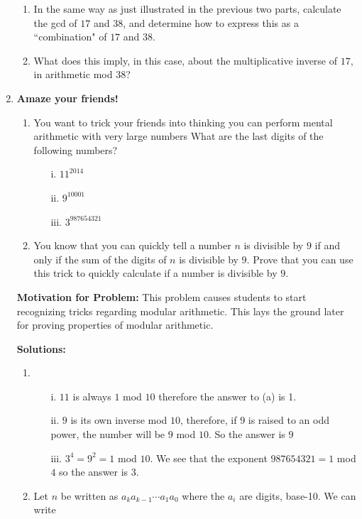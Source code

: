 \documentclass[11pt]{article}
\newif\ifsolutions
\begin{document}
\begin{enumerate}
\begin{enumerate}
\item In the same way as just illustrated in the previous two parts, calculate the gcd of $17$ and $38$, and determine how to express this as a ``combination" of $17$ and $38$. \ifsolutions{$\gcd(17, 38) = 1 = 13 \times 38 - 29 \times 17; also, more simply, -4 \times 38 + 9 \times 17, but the algorithm produces the former$} \fi

\item What does this imply, in this case, about the multiplicative inverse of $17$, in arithmetic mod $38$? \ifsolutions{It is equal to -29, which is equal to 9}

{\bf Motivation for problem:} This is supposed to provide the students with some understanding of how the extended-gcd works. \fi
\end{enumerate}

\item {\bf Amaze your friends!} 
\begin{enumerate}
\item You want to trick your friends into thinking you can perform mental arithmetic with very large numbers
What are the last digits of the following numbers?
\begin{enumerate}
\item[i.] \quad $11^{2014}$
\item[ii.] \quad $9^{10001}$
\item[iii.] \quad $3^{987654321}$
\end{enumerate}
\item You know that you can quickly tell a number $n$ is divisible by $9$ if and only if the sum of the digits of $n$ is divisible by $9$. Prove that you can use this trick to quickly calculate if a number is divisible by $9$.
\end{enumerate}

\ifsolutions
\textbf{Motivation for Problem:} This problem causes students to start recognizing tricks regarding modular arithmetic. This lays the ground later for proving properties of modular arithmetic.

\textbf{Solutions:}
\begin{enumerate}
\item
\begin{enumerate}
\item[i.] \quad $11$ is always $1$ mod $10$ therefore the answer to (a) is 1.
\item[ii.] \quad $9$ is its own inverse mod $10$, therefore, if $9$ is raised to an odd power, the number will be $9$ mod $10$. So the answer is $9$
\item[iii.] \quad $3^4 = 9^2 = 1 $ mod $ 10$. We see that the exponent $987654321 = 1$ mod $4$ so the answer is $3$.
\end{enumerate}
\item  Let $n$ be written as $a_k a_{k-1}\cdots a_1 a_0$ where the $a_i$ are digits, base-10.
       We can write 


\end{enumerate}
\end{enumerate}
\end{document}
